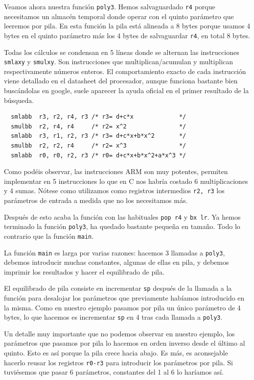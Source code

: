 Veamos ahora nuestra función {\tt poly3}. Hemos salvaguardado {\tt r4} porque
necesitamos un almacén temporal donde operar con el quinto parámetro que
leeremos por pila. En esta función la pila está alineada a 8 bytes porque
usamos 4 bytes en el quinto parámetro más los 4 bytes de salvaguardar {\tt r4},
en total 8 bytes.

Todas los cálculos se condensan en 5 líneas donde se alternan las instrucciones
{\tt smlaxy} y {\tt smulxy}. Son instrucciones que multiplican/acumulan y
multiplican respectivamente números enteros. El comportamiento exacto de cada
instrucción viene detallado en el datasheet del procesador, aunque funciona
bastante bien buscándolas en google, suele aparecer la ayuda oficial en el primer
resultado de la búsqueda.

\begin{lstlisting}
  smlabb  r3, r2, r4, r3 /* r3= d+c*x             */
  smulbb  r2, r4, r4     /* r2= x^2               */
  smlabb  r3, r1, r2, r3 /* r3= d+c*x+b*x^2       */
  smulbb  r2, r2, r4     /* r2= x^3               */
  smlabb  r0, r0, r2, r3 /* r0= d+c*x+b*x^2+a*x^3 */
\end{lstlisting}

Como podéis observar, las instrucciones ARM son muy potentes, permiten
implementar en 5 instrucciones lo que en C nos habría costado 6
multiplicaciones y 4 sumas. Nótese como utilizamos como registros
intermedios {\tt r2, r3} los parámetros de entrada a medida que no los
necesitamos más.

Después de esto acaba la función con las habituales {\tt pop {r4}} y
{\tt bx lr}. Ya hemos terminado la función {\tt poly3}, ha quedado
bastante pequeña en tamaño. Todo lo contrario que la función {\tt main}.

La función {\tt main} es larga por varias razones: hacemos 3 llamadas
a {\tt poly3}, debemos introducir muchas constantes, algunas de ellas
en pila, y debemos imprimir los resultados y hacer el equilibrado de pila.

El equilibrado de pila consiste en incrementar {\tt sp} después de la
llamada a la función para desalojar los parámetros que previamente habíamos
introducido en la misma. Como en nuestro ejemplo pasamos por pila un
único parámetro de 4 bytes, lo que hacemos es incrementar {\tt sp} en 4 tras
cada llamada a {\tt poly3}.

Un detalle muy importante que no podemos observar en nuestro ejemplo, los
parámetros que pasamos por pila lo hacemos en orden inverso desde el último
al quinto. Esto es así porque la pila crece hacia abajo. Es más, es
aconsejable hacerlo reusar los registros {\tt r0-r3} para introducir los
parámetros por pila. Si tuviésemos que pasar 6 parámetros, constantes del
1 al 6 lo haríamos así.


